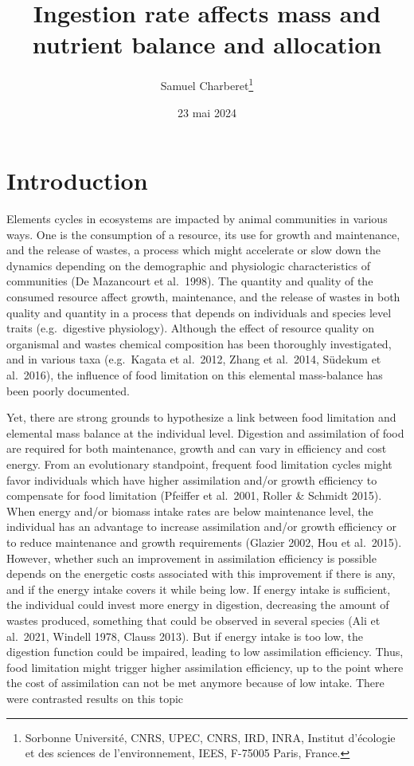 \documentclass[
  12pt,
]{article}
\title{Ingestion rate affects mass and nutrient balance and allocation}
\author{Samuel Charberet\footnote{Sorbonne Université, CNRS, UPEC, CNRS,
  IRD, INRA, Institut d'écologie et des sciences de l'environnement,
  IEES, F-75005 Paris, France.}}
\date{23 mai 2024}
\begin{document}
\maketitle

\section{Introduction}\label{introduction}

Elements cycles in ecosystems are impacted by animal communities in
various ways. One is the consumption of a resource, its use for growth
and maintenance, and the release of wastes, a process which might
accelerate or slow down the dynamics depending on the demographic and
physiologic characteristics of communities (De Mazancourt et al.~1998).
The quantity and quality of the consumed resource affect growth,
maintenance, and the release of wastes in both quality and quantity in a
process that depends on individuals and species level traits
(e.g.~digestive physiology). Although the effect of resource quality on
organismal and wastes chemical composition has been thoroughly
investigated, and in various taxa (e.g.~Kagata et al.~2012, Zhang et
al.~2014, Südekum et al.~2016), the influence of food limitation on this
elemental mass-balance has been poorly documented.

Yet, there are strong grounds to hypothesize a link between food
limitation and elemental mass balance at the individual level. Digestion
and assimilation of food are required for both maintenance, growth and
can vary in efficiency and cost energy. From an evolutionary standpoint,
frequent food limitation cycles might favor individuals which have
higher assimilation and/or growth efficiency to compensate for food
limitation (Pfeiffer et al.~2001, Roller \& Schmidt 2015). When energy
and/or biomass intake rates are below maintenance level, the individual
has an advantage to increase assimilation and/or growth efficiency or to
reduce maintenance and growth requirements (Glazier 2002, Hou et
al.~2015). However, whether such an improvement in assimilation
efficiency is possible depends on the energetic costs associated with
this improvement if there is any, and if the energy intake covers it
while being low. If energy intake is sufficient, the individual could
invest more energy in digestion, decreasing the amount of wastes
produced, something that could be observed in several species (Ali et
al.~2021, Windell 1978, Clauss 2013). But if energy intake is too low,
the digestion function could be impaired, leading to low assimilation
efficiency. Thus, food limitation might trigger higher assimilation
efficiency, up to the point where the cost of assimilation can not be
met anymore because of low intake. There were contrasted results on this
topic
\end{document}
